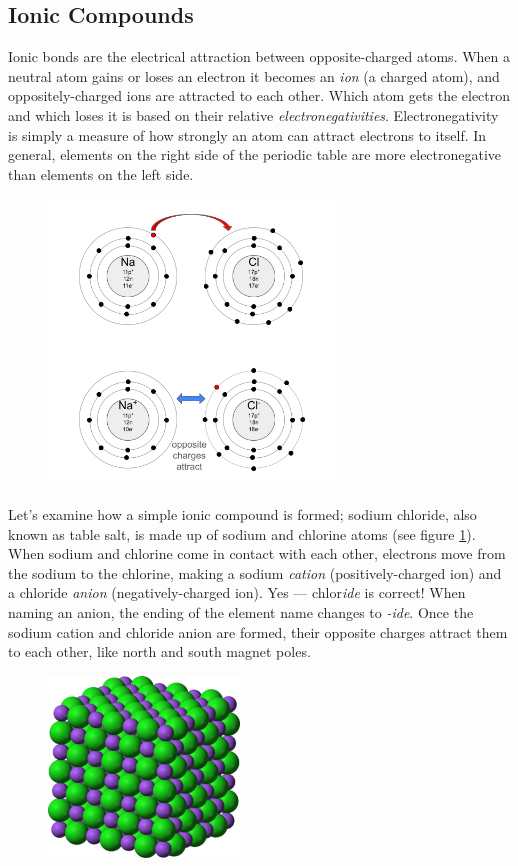 \subsection{Ionic Compounds}
Ionic bonds are the electrical attraction between opposite-charged atoms. When a 
neutral atom gains or loses an electron it becomes an \textit{ion} (a charged 
atom), and oppositely-charged ions are attracted to each other. Which atom gets 
the electron and which loses it is based on their relative 
\textit{electronegativities}. Electronegativity is simply
a measure of how strongly an atom can attract electrons to itself. In general, 
elements on the right side of the periodic table are more electronegative than 
elements on the left side. 

\begin{figure}
\noindent\includegraphics[width=3in]{NaCl_xfer.png}
\caption{}
\label{fig:NaCl_xfer}
\end{figure}

Let's examine how a simple ionic compound is formed; sodium chloride, also known 
as table salt, is made up of sodium and chlorine atoms (see figure 
\ref{fig:NaCl_xfer}). When sodium and chlorine come in contact with each other, 
electrons move from the sodium to the chlorine, making a sodium \textit{cation} 
(positively-charged ion) and a chloride \textit{anion} (negatively-charged ion). 
Yes --- chlor\textit{ide} is correct! When naming an anion, the ending of the 
element name changes to \textit{-ide}. Once the sodium cation and chloride anion 
are formed, their opposite charges attract them to each other, like north and 
south magnet poles. 

\begin{figure}
\noindent\includegraphics[width=2in]{NaCl_lattice.png}
\caption{}
\label{fig:NaCl_lattice}
\end{figure}

